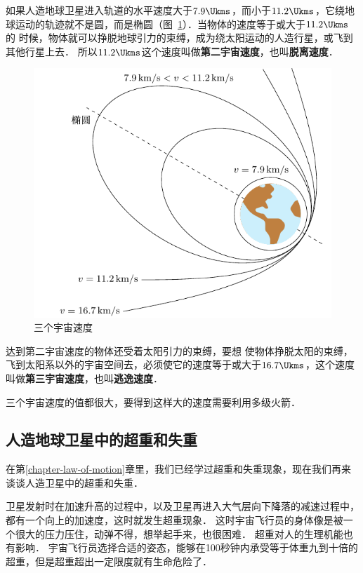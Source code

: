 如果人造地球卫星进入轨道的水平速度大于$7.9\Ukms$，而小于$11.2\Ukms$，它绕地球运动的轨迹就不是圆，而是椭圆（图~\ref{fig_A_5-6}）．当物体的速度等于或大于$11.2\Ukms$的
时候，物体就可以挣脱地球引力的束缚，成为绕太阳运动的人造行星，或飞到其他行星上去．
所以$11.2\Ukms$这个速度叫做\textbf{第二宇宙速度}，也叫\textbf{脱离速度}．
\begin{figure}[htbp]
	\centering
	\includegraphics{fig/A/5-6.pdf}
	\caption{三个宇宙速度}\label{fig_A_5-6}
\end{figure}

达到第二宇宙速度的物体还受着太阳引力的束缚，要想
使物体挣脱太阳的束缚，飞到太阳系以外的宇宙空间去，必须使它的速度等于或大于$16.7\Ukms$，这个速度叫做\textbf{第三宇宙速度}，也叫\textbf{逃逸速度}．

三个宇宙速度的值都很大，要得到这样大的速度需要利用多级火箭．

\subsection{人造地球卫星中的超重和失重}

在第\ref{chapter-law-of-motion}章里，我们已经学过超重和失重现象，现在我们再来谈谈人造卫星中的超重和失重．

卫星发射时在加速升高的过程中，以及卫星再进入大气层向下降落的减速过程中，都有一个向上的加速度，这时就发生超重现象．
这时宇宙飞行员的身体像是被一个很大的压力压住，动弹不得，想举起手来，也很困难．
超重对人的生理机能也有影响．
宇宙飞行员选择合适的姿态，能够在100秒钟内承受等于体重九到十倍的超重，但是超重超出一定限度就有生命危险了．

